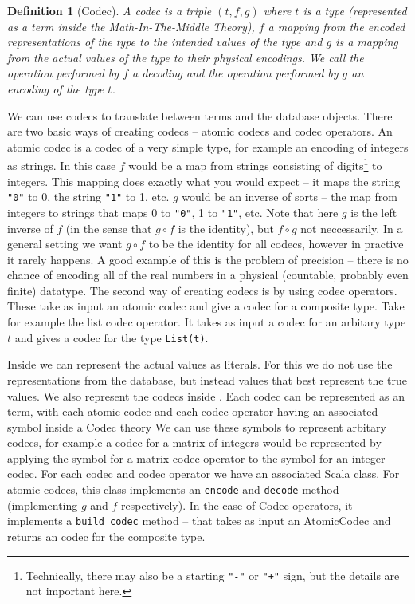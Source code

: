 \documentclass{deliverablereport}
\newtheorem{mydef}{Definition}
\begin{document}
\begin{mydef}[Codec]
A codec is a triple $(t, f, g)$ where $t$ is a type (represented as a term inside the Math-In-The-Middle Theory), $f$ a mapping from the encoded representations of the type to the intended values of the type and $g$ is a mapping from the actual values of the type to their physical encodings. We call the operation performed by $f$ a decoding and the operation performed by $g$ an encoding of the type $t$.
\end{mydef}

We can use codecs to translate between \MMT terms and the database objects. There are two basic ways of creating codecs -- atomic codecs and codec operators. An atomic codec is a codec of a very simple type, for example an encoding of integers as strings. In this case $f$ would be a map from strings consisting of digits\footnote{Technically, there may also be a starting \texttt{"-"} or \texttt{"+"} sign, but the details are not important here. } to integers. This mapping does exactly what you would expect -- it maps the string \texttt{"0"} to 0, the string \texttt{"1"} to 1, etc. $g$ would be an inverse of sorts -- the map from integers to strings that maps 0 to \texttt{"0"}, 1 to \texttt{"1"}, etc. Note that here $g$ is the left inverse of $f$ (in the sense that $g \circ f$ is the identity), but $f \circ g$ not neccessarily. In a general setting we want $g \circ f$ to be the identity for all codecs, however in practive it rarely happens. A good example of this is the problem of precision -- there is no chance of encoding all of the real numbers in a physical (countable, probably even finite) datatype.
The second way of creating codecs is by using codec operators. These take as input an atomic codec and give a codec for a composite type. Take for example the list codec operator. It takes as input a codec for an arbitary type $t$ and gives a codec for the type \texttt{List(t)}.

Inside \MMT we can represent the actual values as literals. For this we do not use the representations from the database, but instead values that best represent the true values. We also represent the codecs inside \MMT. Each codec can be represented as an \MMT term, with each atomic codec  and each codec operator having an associated symbol inside a Codec theory We can use these symbols to represent arbitary codecs, for example a codec for a matrix of integers would be represented by applying the symbol for a matrix codec operator to the symbol for an integer codec. For each codec and codec operator we have an associated Scala class. For atomic codecs, this class implements an \texttt{encode} and \texttt{decode} method (implementing $g$ and $f$ respectively). In the case of Codec operators, it implements a \texttt{build\_codec} method -- that takes as input an AtomicCodec and returns an codec for the composite type.
\end{document}
